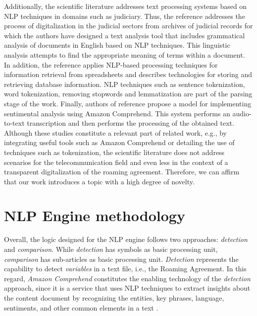 \documentclass[conference]{style/IEEEtran}
\begin{document}
Additionally, the scientific literature addresses text processing systems based on NLP techniques in domains such as judiciary. Thus, the reference \cite{8487847} addresses the process of digitalization in the judicial sectors from archives of judicial records for which the authors have designed a text analysis tool that includes grammatical analysis of documents in English based on NLP techniques. This linguistic analysis attempts to find the appropriate meaning of terms within a document. In addition, the reference \cite{9138070} applies NLP-based processing techniques for information retrieval from spreadsheets and describes technologies for storing and retrieving database information. NLP techniques such as sentence tokenization, word tokenization, removing stopwords and lemmatization are part of the parsing stage of the work. Finally, authors of reference \cite{9104105} propose a model for implementing sentimental analysis using Amazon Comprehend. This system performs an audio-to-text transcription and then performs the processing of the obtained text. Although these studies  constitute a relevant part of related work, e.g., by integrating useful tools such as Amazon Comprehend or detailing the use of techniques such as tokenization, the scientific literature does not address scenarios for the telecommunication field and even less in the context of a transparent digitalization of the roaming agreement. Therefore, we can affirm that our work introduces a topic with a high degree of novelty.

\section{NLP Engine methodology}
Overall, the logic designed for the NLP engine follows two approaches: \textit{detection} and \textit{comparison}. While \textit{detection} has symbols as basic processing unit, \textit{comparison} has sub-articles as basic processing unit. \textit{Detection} represents the capability to detect \textit{variables} in a text file, i.e., the Roaming Agreement. In this regard, \textit{Amazon Comprehend} constitutes the enabling technology of the \textit{detection} approach, since it is a service that uses NLP techniques to extract insights about the content document by recognizing  the  entities,  key  phrases,  language,  sentiments,  and  other  common  elements  in  a  text \cite{AWS2021}.
\end{document}
